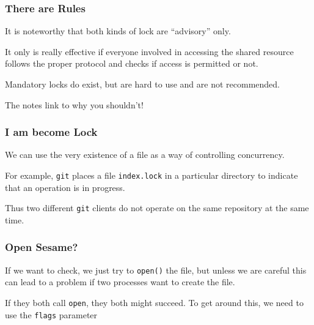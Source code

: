 \begin{frame}
	\frametitle{There are Rules}

	It is noteworthy that both kinds of lock are ``advisory'' only.

	It only is really effective if everyone involved in accessing the shared resource follows the proper protocol and checks if access is permitted or not.

	Mandatory locks do exist, but are hard to use and are not recommended.

	The notes link to why you shouldn't!


\end{frame}

\begin{frame}
	\frametitle{I am become Lock}

	We can use the very existence of a file as a way of controlling concurrency.

	For example, \texttt{git} places a file \texttt{index.lock} in a particular directory to indicate that an operation is in progress.

	Thus two different \texttt{git} clients do not operate on the same repository at the same time.

\end{frame}



\begin{frame}
	\frametitle{Open Sesame?}

	If we want to check, we just try to \texttt{open()} the file, but unless we are careful this can lead to a problem if two processes want to create the file.

	If they both call \texttt{open}, they both might succeed. To get around this, we need to use the \texttt{flags} parameter

\end{frame}



